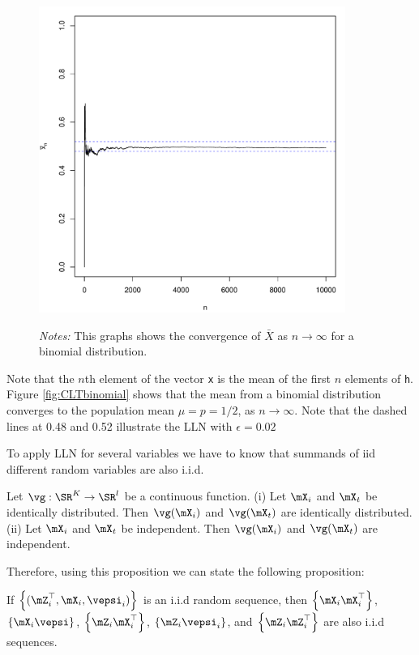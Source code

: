 \documentclass[english,12pt]{book}\usepackage[]{graphicx}\usepackage[]{xcolor}
\newenvironment{knitrout}{}{} %
\begin{document}
\begin{example}
\begin{figure}[H]
\begin{minipage}{.9\linewidth}
\begin{knitrout}
{\centering \includegraphics[width=10cm,height=10cm]{figure/CLT-binomialPlot-1} 

}


\end{knitrout}
\footnotesize
		\emph{Notes:} This graphs shows the convergence of $\bar{X}$ as $n\to\infty$ for a binomial distribution.
	\end{minipage}
\end{figure}

Note that the $n$th element of the vector \texttt{x} is the mean of the first $n$ elements of \texttt{h}. Figure \ref{fig:CLTbinomial} shows that the mean from a binomial distribution converges to the population mean $\mu = p = 1/2$, as $n\to \infty$. Note that the dashed lines at 0.48 and 0.52 illustrate the LLN with $\epsilon = 0.02$
\end{example}

To apply LLN for several variables we have to know that summands of iid different random variables are also i.i.d.

\begin{proposition}
	Let $\vg:\SR^K\to \SR^l$ be a continuous function. (i) Let $\mX_i$ and $\mX_t$ be identically distributed. Then $\vg(\mX_i)$ and $\vg(\mX_t)$ are identically distributed. (ii) Let $\mX_i$ and $\mX_t$ be independent. Then $\vg(\mX_i)$ and $\vg(\mX_t)$ are independent.
\end{proposition}

Therefore, using this proposition we can state the following proposition:

\begin{proposition}\label{proposition:iid_transf}
	If $\left\{(\mZ_i^\top,\mX_i,\vepsi_i)\right\}$ is an i.i.d random sequence, then $\left\{\mX_i\mX_i^\top\right\}$, $\left\{\mX_i\vepsi\right\}$, $\left\{\mZ_i\mX_i^\top\right\}$, $\left\{\mZ_i\vepsi_i\right\}$, and $\left\{\mZ_i\mZ_i^\top\right\}$ are also i.i.d sequences. 
\end{proposition}
\end{document}
